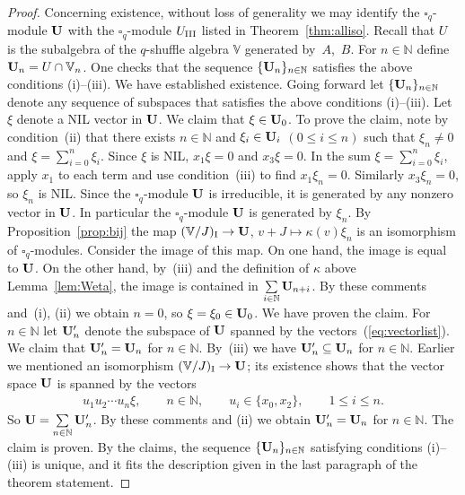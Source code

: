 \documentclass[pdftex]{sigma}
\numberwithin{equation}{section}
\begin{document}
\begin{proof}Concerning existence, without loss of generality we may identify the $\square_q$-module ${\bf U}$ with the $\square_q$-module $U_{\rm III}$ listed in Theorem~\ref{thm:alliso}. Recall that $U$ is the subalgebra of the $q$-shuffle algebra $\mathbb V$ generated by~$A$,~$B$. For $n \in \mathbb N$ define ${\bf U}_n = U\cap \mathbb V_n$. One checks that the sequence $\lbrace {\bf U}_n\rbrace_{n \in \mathbb N}$ satisfies the above conditions (i)--(iii). We have established existence. Going forward let $\lbrace {\bf U}_n\rbrace_{n \in \mathbb N}$ denote any sequence of subspaces that satisfies the above conditions (i)--(iii). Let~$\xi$ denote a NIL vector in ${\bf U}$. We claim that $\xi \in {\bf U}_0$. To prove the claim, note by condition~(ii) that there exists $n \in \mathbb N$ and $\xi_i \in {\bf U}_i$ $(0 \leq i \leq n)$ such that $\xi_n\not=0$ and $\xi = \sum\limits_{i=0}^n \xi_i$. Since $\xi $ is NIL, $x_1 \xi = 0 $ and
$x_3 \xi=0$. In the sum $\xi = \sum\limits_{i=0}^n \xi_i$, apply $x_1$ to each term and use condition~(iii) to find $x_1 \xi_n = 0$. Similarly $x_3 \xi_n=0$, so $\xi_n$ is NIL. Since the $\square_q$-module ${\bf U}$ is irreducible, it is generated by any nonzero vector in ${\bf U}$. In particular the $\square_q$-module ${\bf U}$ is generated by $\xi_n$. By Proposition~\ref{prop:bij} the map $(\mathbb V/J)_{\rm I} \to {\bf U}$, $v + J \mapsto \kappa(v)\xi_n$ is an isomorphism of $\square_q$-modules. Consider the image of this map. On one hand, the image is equal to $\bf U$. On the other hand, by~(iii) and the definition of $\kappa$ above Lemma~\ref{lem:Weta}, the image is contained in $\sum\limits_{i\in \mathbb N} {\bf U}_{n+i}$.
By these comments and~(i), (ii) we obtain $n=0$, so $\xi =\xi_0 \in {\bf U}_0$. We have proven the claim.
For $n \in \mathbb N$ let ${\bf U}'_n$ denote the subspace of $\bf U$ spanned by the vectors~(\ref{eq:vectorlist}). We claim that ${\bf U}'_n= {\bf U}_n$ for $n \in \mathbb N$. By~(iii) we have
${\bf U}'_n \subseteq {\bf U}_n$ for $n \in \mathbb N$. Earlier we mentioned an isomorphism $(\mathbb V/J)_{\rm I} \to {\bf U}$; its existence shows that the vector space ${\bf U}$ is spanned by the vectors
\begin{gather*}
u_1 u_2 \cdots u_n \xi, \qquad n \in \mathbb N, \qquad
u_i \in \lbrace x_0, x_2\rbrace, \qquad 1 \leq i \leq n.
\end{gather*}
So ${\bf U} = \sum\limits_{n \in \mathbb N} {\bf U}'_n$. By these comments and (ii) we obtain ${\bf U}'_n = {\bf U}_n$ for $n \in \mathbb N$. The claim is proven. By the claims, the sequence $\lbrace {\bf U}_n\rbrace_{n \in \mathbb N}$ satisfying conditions (i)--(iii) is unique, and it fits the description given in the last paragraph of the theorem statement.
\end{proof}
\end{document}
